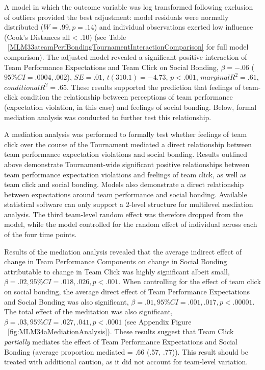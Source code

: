 \begin{CJK}{UTF8}{gbsn}
A model in which the outcome variable was log transformed following exclusion of outliers provided the best adjustment: model residuals were normally distributed ($W = .99, p = .14$) and individual observations exerted low influence (Cook's Distances all < .10) (see Table ~\ref{MLM33ateamPerfBondingTournamentInteractionComparison} for full model comparison). The adjusted model revealed a significant positive interaction of Team Performance Expectations and Team Click on Social Bonding, $\beta = -.06$ ($95\% CI =  .0004, .002$), $SE = .01$, $t(310.1) = -4.73$, $p < .001$, $marginal R^2 = .61$, $conditional R^2 = .65$. These results supported the prediction that feelings of team-click condition the relationship between perceptions of team performance (expectation violation, in this case) and feelings of social bonding.  Below, formal mediation analysis was conducted to further test this relationship.


       

A mediation analysis was performed to formally test whether feelings of team click over the course of the Tournament mediated a direct relationship between team performance expectation violations and social bonding.  Results outlined above demonstrate Tournament-wide significant positive relationships between team performance expectation violations and feelings of team click, as well as team click and social bonding. Models also demonstrate a direct relationship between expectations around team performance and social bonding.  Available statistical software can only support a 2-level structure for multilevel mediation analysis. The third team-level random effect was therefore dropped from the model, while the model controlled for the random effect of individual across each of the four time points.

Results of the mediation analysis revealed that the average indirect effect of change in Team Performance Components on change in Social Bonding attributable to change in Team Click was highly significant albeit small, $\beta = .02, 95\% CI = .018 , .026, p < .001$.  When controlling for the effect of team click on social bonding, the average direct effect of Team Performance Expectations and Social Bonding was also significant, $\beta = .01, 95\% CI = .001 , .017, p < .00001$.  The total effect of the meditation was also significant, $\beta = .03, 95\% CI = .027, .041, p < .0001$ (see Appendix Figure ~\ref{fig:MLM34aMediationAnalysis}).  These results suggest that Team Click \textit{partially} mediates the effect of Team Performance Expectations and Social Bonding (average proportion mediated = .66 (.57, .77)).  This result should be treated with additional caution, as it did not account for team-level variation.


\end{CJK}
